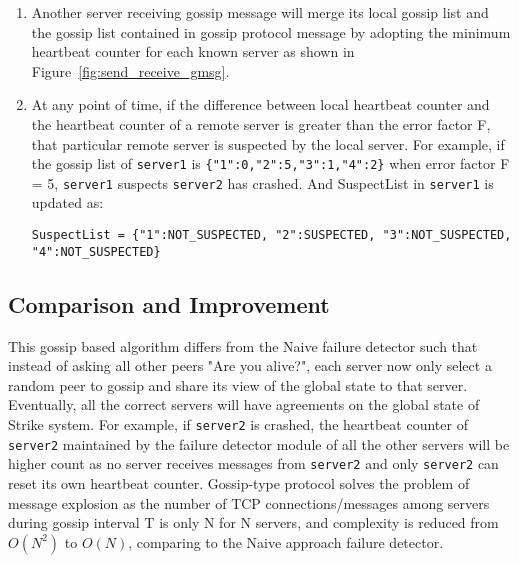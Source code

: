 \documentclass[dareport.tex]{subfiles}
\begin{document}
\begin{enumerate}[leftmargin=*]

\item Another server receiving gossip message will merge its local gossip list and the gossip list contained in gossip protocol message by adopting the minimum heartbeat counter for each known server as shown in Figure~\ref{fig:send_receive_gmsg}.


\item At any point of time, if the difference between local heartbeat counter and the heartbeat counter of a remote server is greater than the error factor F, that particular remote server is suspected by the local server. For example, if the gossip list of \verb|server1| is \verb|{"1":0,"2":5,"3":1,"4":2}| when error factor F = 5, \verb|server1| suspects \verb|server2| has crashed. And SuspectList in \verb|server1| is updated as:
\begin{small}
\begin{verbatim}
SuspectList = {"1":NOT_SUSPECTED, "2":SUSPECTED, "3":NOT_SUSPECTED, "4":NOT_SUSPECTED}
\end{verbatim}
\end{small}


\end{enumerate}

\subsection{Comparison and Improvement}

This gossip based algorithm differs from the Naive failure detector such that instead of asking all other peers "Are you alive?", each server now only select a random peer to gossip and share its view of the global state to that server. Eventually, all the correct servers will have agreements on the global state of Strike system. For example, if \verb|server2| is crashed, the heartbeat counter of \verb|server2| maintained by the failure detector module of all the other servers will be higher count as no server receives messages from \verb|server2| and only \verb|server2| can reset its own heartbeat counter. Gossip-type protocol solves the problem of message explosion as the number of TCP connections/messages among servers during gossip interval T is only N for N servers, and complexity is reduced from $O({N^2})$ to $O(N)$, comparing to the Naive approach failure detector.
\end{document}
